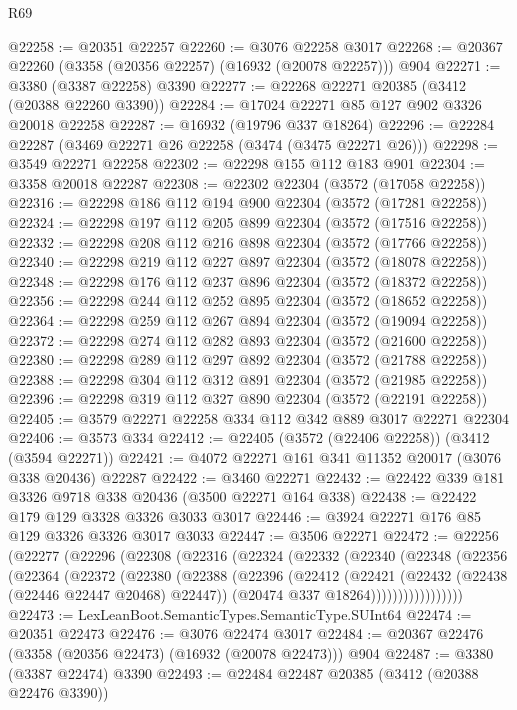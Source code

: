 \begin{lexlean}{R69}
\begin{coremodule}
@22258 := @20351 @22257
@22260 := @3076 @22258 @3017
@22268 := @20367 @22260 (@3358 (@20356 @22257) (@16932 (@20078 @22257))) @904
@22271 := @3380 (@3387 @22258) @3390
@22277 := @22268 @22271 @20385 (@3412 (@20388 @22260 @3390))
@22284 := @17024 @22271 @85 @127 @902 @3326 @20018 @22258
@22287 := @16932 (@19796 @337 @18264)
@22296 := @22284 @22287 (@3469 @22271 @26 @22258 (@3474 (@3475 @22271 @26)))
@22298 := @3549 @22271 @22258
@22302 := @22298 @155 @112 @183 @901
@22304 := @3358 @20018 @22287
@22308 := @22302 @22304 (@3572 (@17058 @22258))
@22316 := @22298 @186 @112 @194 @900 @22304 (@3572 (@17281 @22258))
@22324 := @22298 @197 @112 @205 @899 @22304 (@3572 (@17516 @22258))
@22332 := @22298 @208 @112 @216 @898 @22304 (@3572 (@17766 @22258))
@22340 := @22298 @219 @112 @227 @897 @22304 (@3572 (@18078 @22258))
@22348 := @22298 @176 @112 @237 @896 @22304 (@3572 (@18372 @22258))
@22356 := @22298 @244 @112 @252 @895 @22304 (@3572 (@18652 @22258))
@22364 := @22298 @259 @112 @267 @894 @22304 (@3572 (@19094 @22258))
@22372 := @22298 @274 @112 @282 @893 @22304 (@3572 (@21600 @22258))
@22380 := @22298 @289 @112 @297 @892 @22304 (@3572 (@21788 @22258))
@22388 := @22298 @304 @112 @312 @891 @22304 (@3572 (@21985 @22258))
@22396 := @22298 @319 @112 @327 @890 @22304 (@3572 (@22191 @22258))
@22405 := @3579 @22271 @22258 @334 @112 @342 @889 @3017 @22271 @22304
@22406 := @3573 @334
@22412 := @22405 (@3572 (@22406 @22258)) (@3412 (@3594 @22271))
@22421 := @4072 @22271 @161 @341 @11352 @20017 (@3076 @338 @20436) @22287
@22422 := @3460 @22271
@22432 := @22422 @339 @181 @3326 @9718 @338 @20436 (@3500 @22271 @164 @338)
@22438 := @22422 @179 @129 @3328 @3326 @3033 @3017
@22446 := @3924 @22271 @176 @85 @129 @3326 @3326 @3017 @3033
@22447 := @3506 @22271
@22472 := @22256
    (@22277
      (@22296
        (@22308
          (@22316
            (@22324
              (@22332
                (@22340
                  (@22348
                    (@22356
                      (@22364
                        (@22372
                          (@22380
                            (@22388
                              (@22396
                                (@22412
                                  (@22421
                                    (@22432 (@22438 (@22446 @22447 @20468) @22447))
                                    (@20474 @337 @18264)))))))))))))))))
@22473 := LexLeanBoot.SemanticTypes.SemanticType.SUInt64
@22474 := @20351 @22473
@22476 := @3076 @22474 @3017
@22484 := @20367 @22476 (@3358 (@20356 @22473) (@16932 (@20078 @22473))) @904
@22487 := @3380 (@3387 @22474) @3390
@22493 := @22484 @22487 @20385 (@3412 (@20388 @22476 @3390))

\end{coremodule}
\end{lexlean}
